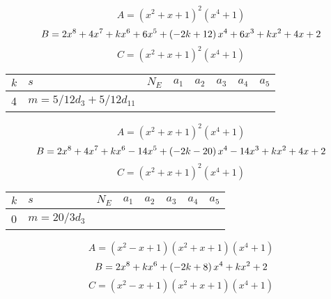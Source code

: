 \documentclass{amsart}
\begin{document}
$$A=(x^2
 + x
 + 1)^{2}(x^4
 + 1)$$
$$B=2\*x^8
 + 4\*x^7
 + k\*x^6
 + 6\*x^5
 + \left(-2\*k
 + 12\right) \*x^4
 + 6\*x^3
 + k\*x^2
 + 4\*x
 + 2$$
$$C=(x^2
 + x
 + 1)^{2}(x^4
 + 1)$$
\begin{longtable}{|l|l|l|lllll|}
\hline
$k$ & $s$ & $N_E$ & $a_1$ & $a_2$ & $a_3$ & $a_4$ & $a_5$\\
\hline
4&$m=5/12d_{3}+5/12d_{11}$&&\multicolumn{5}{c|}{}\\
\hline
\end{longtable}
$$A=(x^2
 + x
 + 1)^{2}(x^4
 + 1)$$
$$B=2\*x^8
 + 4\*x^7
 + k\*x^6
 - 14\*x^5
 + \left(-2\*k
 - 20\right) \*x^4
 - 14\*x^3
 + k\*x^2
 + 4\*x
 + 2$$
$$C=(x^2
 + x
 + 1)^{2}(x^4
 + 1)$$
\begin{longtable}{|l|l|l|lllll|}
\hline
$k$ & $s$ & $N_E$ & $a_1$ & $a_2$ & $a_3$ & $a_4$ & $a_5$\\
\hline
0&$m=20/3d_{3}$&&\multicolumn{5}{c|}{}\\
\hline
\end{longtable}
$$A=(x^2
 - x
 + 1)(x^2
 + x
 + 1)(x^4
 + 1)$$
$$B=2\*x^8
 + k\*x^6
 + \left(-2\*k
 + 8\right) \*x^4
 + k\*x^2
 + 2$$
$$C=(x^2
 - x
 + 1)(x^2
 + x
 + 1)(x^4
 + 1)$$
\end{document}
